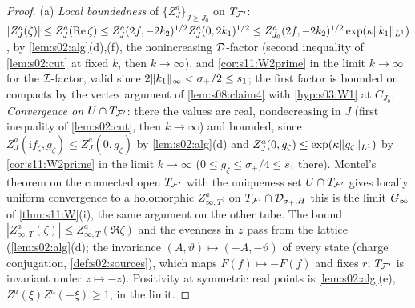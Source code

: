\begin{proof}
(a) \emph{Local boundedness} of $\{Z^a_J\}_{J\ge J_0}$ on $T_{\mathcal F'}$: $|Z^a_J(\zeta)|\le Z^a_J(\operatorname{Re}\zeta)\le Z^a_J(2f,-2k_2)^{1/2}Z^a_J(0,2k_1)^{1/2}\le Z^a_{J_0}(2f,-2k_2)^{1/2}\exp(\kappa\lVert k_1\rVert_{L^1})$, by \cref{lem:s02:alg}(d),(f), the nonincreasing $\mathcal D$-factor (second inequality of \cref{lem:s02:cut} at fixed $k$, then $k\to\infty$), and \cref{cor:s11:W2prime} in the limit $k\to\infty$ for the $\mathcal I$-factor, valid since $2\lVert k_1\rVert_\infty<\sigma_+/2\le s_1$; the first factor is bounded on compacts by the vertex argument of \cref{lem:s08:claim4} with \cref{hyp:s03:W1} at $C_{J_0}$. \emph{Convergence on $U\cap T_{\mathcal F'}$}: there the values are real, nondecreasing in $J$ (first inequality of \cref{lem:s02:cut}, then $k\to\infty$) and bounded, since $Z^a_J(\mathrm if_\zeta,g_\zeta)\le Z^a_J(0,g_\zeta)$ by \cref{lem:s02:alg}(d) and $Z^a_J(0,g_\zeta)\le\exp(\kappa\lVert g_\zeta\rVert_{L^1})$ by \cref{cor:s11:W2prime} in the limit $k\to\infty$ ($0\le g_\zeta\le\sigma_+/4\le s_1$ there). Montel's theorem on the connected open $T_{\mathcal F'}$ with the uniqueness set $U\cap T_{\mathcal F'}$ gives locally uniform convergence to a holomorphic $Z^a_{\infty,T}$; on $T_{\mathcal F'}\cap\mathcal D_{\sigma_+,H}$ this is the limit $G_\infty$ of \cref{thm:s11:W}(i), the same argument on the other tube. The bound $|Z^a_{\infty,T}(\zeta)|\le Z^a_{\infty,T}(\Re\zeta)$ and the evenness in $z$ pass from the lattice (\cref{lem:s02:alg}(d); the invariance $(A,\vartheta)\mapsto(-A,-\vartheta)$ of every state (charge conjugation, \cref{def:s02:sources}), which maps $F(f)\mapsto-F(f)$ and fixes $r$; $T_{\mathcal F'}$ is invariant under $z\mapsto-z$). Positivity at symmetric real points is \cref{lem:s02:alg}(e), $Z^a(\xi)Z^a(-\xi)\ge1$, in the limit.


\end{proof}
